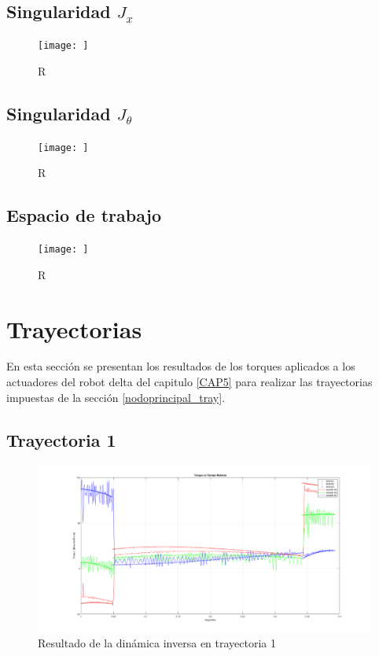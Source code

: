     \newpage
    
    \subsection{Singularidad $J_{x}$}
        \begin{figure}[h]
            \centering
            \texttt{[image: ]}
            \caption{R}
            \label{f:cap7_ws4}
        \end{figure}  
    
    \subsection{Singularidad $J_{\theta}$}
        \begin{figure}[h]
            \centering
            \texttt{[image: ]}
            \caption{R}
            \label{f:cap7_ws5}
        \end{figure}  
        
    \newpage
    
    \subsection{Espacio de trabajo}
        \begin{figure}[h]
            \centering
            \texttt{[image: ]}
            \caption{R}
            \label{f:cap7_ws6}
        \end{figure}  

        
        
        
        
\newpage


\section{Trayectorias}
    En esta sección se presentan los resultados de los torques aplicados a los actuadores del robot delta del capitulo \ref{CAP5} para realizar las trayectorias impuestas de la sección \ref{nodoprincipal_tray}.
    
    \subsection{Trayectoria 1}
    
        \begin{figure}[h]
            \centering
            \includegraphics[width=0.9\linewidth]{Main/Chapter7/Images7/1.png}
            \caption{Resultado de la dinámica inversa en trayectoria 1}
            \label{f:cap7_tray1}
        \end{figure}
                
